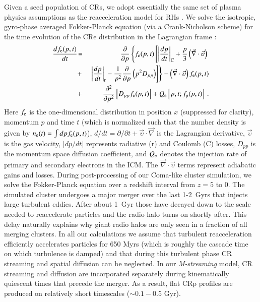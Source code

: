 \documentclass[useAMS,usenatbib]{mn2e}
\newcommand{\Mstream}{{\it M-streaming}\xspace}
\begin{document}
Given a seed population of CRs, we adopt essentially the same set of
plasma physics assumptions as the reacceleration model for RHs
\citep{brunetti07,brunetti11}. We solve the isotropic, gyro-phase
averaged Fokker-Planck equation (via a Crank-Nicholson scheme) for the
time evolution of the CRe distribution in the Lagrangian frame
\citep{brunetti07,brunetti11}:
\begin{eqnarray}
{{d f_{{\mathrm{e}}}(p,t)}\over{d t}} &\!=&
\frac{\partial}{\partial p}
\left\{
f_{{\mathrm{e}}}(p,t)\left[
\left|{{dp}\over{dt}}\right|_{\rm C} 
+ \frac{p}{3}\left(\vec{\nabla}\cdot \vec{\upsilon}\right)\right.\right.
\nonumber\\
&+& \left.\left. \left|{{dp}\over{dt}}\right|_{\rm r}
- {1\over{p^2}}{{\partial }\over{\partial p}}\left(p^2 D_{pp}\right) 
\right]\right\} - \left(\vec{\nabla}\cdot \vec{\upsilon}\right) f_{{\mathrm{e}}}(p,t)
\nonumber\\
&+& {{\partial^2 }\over{\partial p^2}}
\left[
D_{pp} f_{{\mathrm{e}}}(p,t) \right]+ Q_{{\mathrm{e}}}\left[p,t;f_{{\mathrm{p}}}(p,t)\right]   \, .
\label{elettroni}
\end{eqnarray}
Here $f_{{\mathrm{e}}}$ is the one-dimensional distribution in position $x$
(suppressed for clarity), momentum $p$ and time $t$ (which is
normalized such that the number density is given by
$n_{{\mathrm{e}}}(t)=\int d p f_{{\mathrm{e}}}(p,t)$), $d/dt=\partial/\partial
t+\vec{\upsilon}\cdot \vec{\nabla}$ is the Lagrangian derivative,
$\vec{\upsilon}$ is the gas velocity, $|dp/dt|$ represents radiative
(r) and Coulomb (C) losses, $D_{pp}$ is the momentum space diffusion
coefficient, and $Q_{{\mathrm{e}}}$ denotes the injection rate of primary
and secondary electrons in the ICM. The $\vec{\nabla}\cdot
\vec{\upsilon}$ terms represent adiabatic gains and losses. During
post-processing of our Coma-like cluster simulation, we solve the
Fokker-Planck equation over a redshift interval from $z=5$ to 0. The
simulated cluster undergoes a major merger over the last 1-2~Gyrs that
injects large turbulent eddies. After about 1~Gyr those have decayed
down to the scale needed to reaccelerate particles and the radio halo
turns on shortly after. This delay naturally explains why giant radio
halos are only seen in a fraction of all merging clusters. In all our
calculations we assume that turbulent reacceleration efficiently
accelerates particles for 650 Myrs (which is roughly the cascade time
on which turbulence is damped) and that during this turbulent phase CR
streaming and spatial diffusion can be neglected. In our \Mstream
model, CR streaming and diffusion are incorporated separately during
kinematically quiescent times that precede the merger. As a result,
flat CRp profiles are produced on relatively short timescales ($\sim
0.1-0.5$ Gyr).
\end{document}
